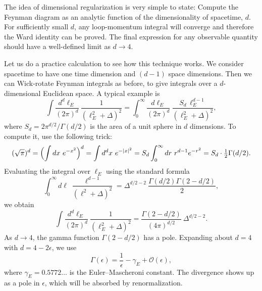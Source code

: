The idea of dimensional regularization is very simple to state: Compute the
Feynman diagram as an analytic function of the dimensionality of spacetime,
$d$.  For sufficiently small $d$, any loop-momentum integral will converge and
therefore the Ward identity can be proved.  The final expression for any
observable quantity should have a well-defined limit as $d\to 4$.

Let us do a practice calculation to see how this technique works.  We consider
spacetime to have one time dimension and $(d-1)$ space dimensions.  Then we
can Wick-rotate Feynman integrals as before, to give integrals over a
$d$-dimensional Euclidean space.  A typical example is
\begin{equation}
  \int \frac{d^d\ell_E}{(2\pi)^d}\ \frac{1}{(\ell_E^2 + \Delta)^2}
  = \int_0^{\infty} \frac{d\ell_E}{(2\pi)^d}\ \frac{S_d\,\ell_E^{d-1}}
    {(\ell_E^2 + \Delta)^2} ,
  \label{eq:7.80}
\end{equation}
where $S_d = 2\pi^{d/2}/\Gamma(d/2)$ is the area of a unit sphere in $d$
dimensions.  To compute it, use the following trick:
\begin{equation}
  (\sqrt{\pi})^d = \Bigl( \int dx\ e^{-x^2} \Bigr)^d
    = \int d^d x\ e^{-|x|^2}
    = S_d \int_0^{\infty} dr\ r^{d-1} e^{-r^2}
    = S_d\cdot \tfrac{1}{2}\Gamma(d/2) .
\end{equation}
Evaluating the integral over $\ell_E$ using the standard formula
\begin{equation}
  \int_0^{\infty} d\ell\ \frac{\ell^{d-1}}{(\ell^2+\Delta)^2}
    = \Delta^{d/2-2}\ \frac{\Gamma(d/2)\Gamma(2-d/2)}{2},
\end{equation}
we obtain
\begin{equation}
  \int \frac{d^d\ell_E}{(2\pi)^d}\ \frac{1}{(\ell_E^2+\Delta)^2}
  = \frac{\Gamma(2-d/2)}{(4\pi)^{d/2}}\ \Delta^{d/2-2} .
  \label{eq:7.81}
\end{equation}
As $d\to 4$, the gamma function $\Gamma(2-d/2)$ has a pole.  Expanding about
$d=4$ with $d = 4-2\epsilon$, we use
\begin{equation}
  \Gamma(\epsilon) = \frac{1}{\epsilon} - \gamma_E + \mathcal{O}(\epsilon),
\end{equation}
where $\gamma_E = 0.5772\ldots$ is the Euler--Mascheroni constant.  The
divergence shows up as a pole in $\epsilon$, which will be absorbed by
renormalization.

